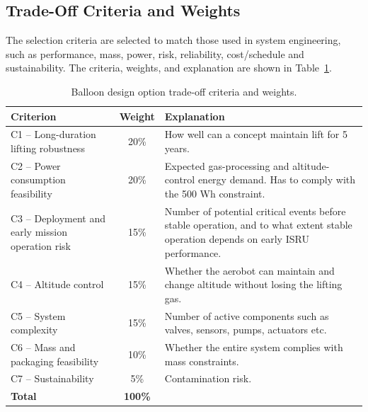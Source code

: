 \subsection{Trade-Off Criteria and Weights}
\label{subsec:balloon_trade_criteria}

The selection criteria are selected to match those used in system engineering, such as performance, mass, power, risk, reliability, cost/schedule and sustainability. The criteria, weights, and explanation are shown in Table~\ref{tab:balloon_trade_criteria}.

\begin{table}[H]
\centering
\caption{Balloon design option trade-off criteria and weights.}
\label{tab:balloon_trade_criteria}
\footnotesize
\renewcommand{\arraystretch}{1.12}
\setlength{\tabcolsep}{5pt}
\begin{tabularx}{\textwidth}{@{}p{} c X@{}}
\toprule
\textbf{Criterion} & \textbf{Weight} & \textbf{Explanation} \\
\midrule
C1 -- Long-duration lifting robustness 
& 20\%  
& How well can a concept maintain lift for 5 years. \\

C2 -- Power consumption feasibility 
& 20\% 
& Expected gas-processing and altitude-control energy demand. Has to comply with the 500 Wh constraint. \\

C3 -- Deployment and early mission operation risk 
& 15\% 
& Number of potential critical events before stable operation, and to what extent stable operation depends on early ISRU performance. \\

C4 -- Altitude control 
& 15\%  
& Whether the aerobot can maintain and change altitude without losing the lifting gas. \\

C5 -- System complexity 
& 15\%  
& Number of active components such as valves, sensors, pumps, actuators etc. \\

C6 -- Mass and packaging feasibility 
& 10\%  
& Whether the entire system complies with mass constraints. \\

C7 -- Sustainability 
& 5\%  
& Contamination risk. \\
\midrule
\textbf{Total} & \textbf{100\%} & \\
\bottomrule
\end{tabularx}
\end{table}


